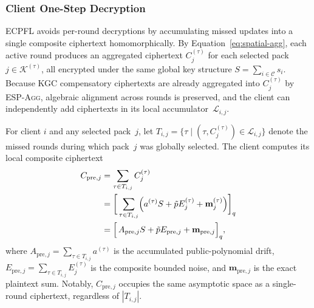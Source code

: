 \subsubsection{Client One-Step Decryption}
\label{sssec:prefetch-decrypt}

\textsc{ECPFL} avoids per-round decryptions by accumulating missed updates into a single composite ciphertext homomorphically.
By Equation~\eqref{eq:spatial-agg}, each active round produces an aggregated ciphertext $C_j^{(\tau)}$ for each selected pack $j \in \mathcal{K}^{(\tau)}$, all encrypted under the same global key structure $S = \sum_{i \in \mathcal{C}} s_i$.
Because KGC compensatory ciphertexts are already aggregated into $C_j^{(\tau)}$ by \textsc{ESP-Agg}, algebraic alignment across rounds is preserved, and the client can independently add ciphertexts in its local accumulator~$\mathcal{L}_{i,j}$.

For client $i$ and any selected pack~$j$, let $T_{i,j} = \{\tau \mid (\tau, C_j^{(\tau)}) \in \mathcal{L}_{i,j}\}$ denote the missed rounds during which pack~$j$ was globally selected.
The client computes its local composite ciphertext
\begin{equation}
\begin{aligned}
    C_{\mathrm{pre},j} &= \sum_{\tau \in T_{i,j}} C_{j}^{(\tau)} \\
    &= \biggl[\, \sum_{\tau \in T_{i,j}} \Bigl( a^{(\tau)} S + \tilde{p} E_j^{(\tau)} + \mathbf{m}_j^{(\tau)} \Bigr) \biggr]_{q} \\
    &= \Bigl[\, A_{\mathrm{pre},j} S + \tilde{p} E_{\mathrm{pre},j} + \mathbf{m}_{\mathrm{pre}, j} \Bigr]_{q},
    \label{eq:prefetch-accumulation}
\end{aligned}
\end{equation}
where $A_{\mathrm{pre},j} = \sum_{\tau \in T_{i,j}} a^{(\tau)}$ is the accumulated public-polynomial drift, $E_{\mathrm{pre},j} = \sum_{\tau \in T_{i,j}} E_j^{(\tau)}$ is the composite bounded noise, and $\mathbf{m}_{\mathrm{pre}, j}$ is the exact plaintext sum.
Notably, $C_{\mathrm{pre},j}$ occupies the same asymptotic space as a single-round ciphertext, regardless of $|T_{i,j}|$.

